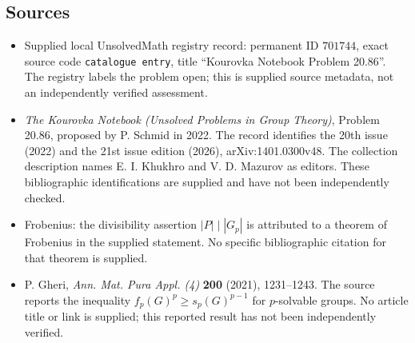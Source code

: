 \documentclass[11pt]{article}
\begin{document}
\subsection{Sources}
\begin{itemize}
\item Supplied local UnsolvedMath registry record: permanent ID \(701744\), exact source code \texttt{catalogue entry}, title ``Kourovka Notebook Problem 20.86''. The registry labels the problem open; this is supplied source metadata, not an independently verified assessment.
\item \emph{The Kourovka Notebook (Unsolved Problems in Group Theory)}, Problem 20.86, proposed by P. Schmid in 2022. The record identifies the 20th issue (2022) and the 21st issue edition (2026), arXiv:1401.0300v48. The collection description names E. I. Khukhro and V. D. Mazurov as editors. These bibliographic identifications are supplied and have not been independently checked.
\item Frobenius: the divisibility assertion \(|P|\mid |G_p|\) is attributed to a theorem of Frobenius in the supplied statement. No specific bibliographic citation for that theorem is supplied.
\item P. Gheri, \emph{Ann. Mat. Pura Appl. (4)} \textbf{200} (2021), 1231--1243. The source reports the inequality \(f_p(G)^p\ge s_p(G)^{p-1}\) for \(p\)-solvable groups. No article title or link is supplied; this reported result has not been independently verified.
\end{itemize}
\end{document}
